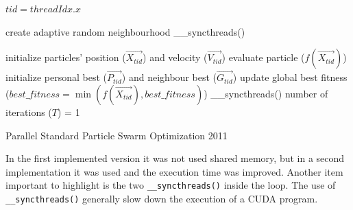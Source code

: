 \documentclass[conference]{IEEEtran}
\begin{document}
    \begin{algorithm}[!htb]
        
        $tid = threadIdx.x\;$

        create adaptive random neighbourhood\;
        \_\_syncthreads()\;

        initialize particles' position ($\vec{X_{tid}}$) and velocity ($\vec{V_{tid}}$)\;
        evaluate particle ($f(\vec{X_{tid}})$)\;
        initialize personal best ($\vec{P_{tid}}$) and neighbour best ($\vec{G_{tid}}$)\;
        update global best fitness ($best\_fitness=\min(f(\vec{X_{tid}}), best\_fitness)$)\;
        \_\_syncthreads()\;
        number of iterations ($T$) = 1\;
        
        
        \caption{Parallel Standard Particle Swarm Optimization 2011}
        \label{alg:pspso2011}
    \end{algorithm}

    In the first implemented version it was not used shared memory, but in a second implementation it was used and the execution time was improved.
    Another item important to highlight is the two \texttt{\_\_syncthreads()} inside the loop.
    The use of \texttt{\_\_syncthreads()} generally slow down the execution of a CUDA program.
\end{document}
